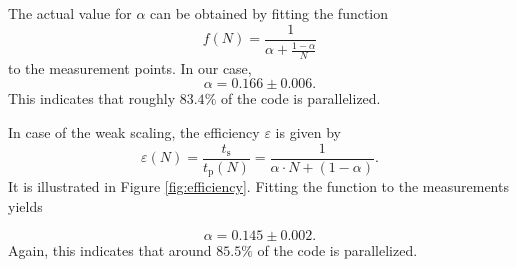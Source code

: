 \documentclass[12pt, a4paper, titlepage]{article}
\begin{document}
{%

The actual value for $\alpha$ can be obtained by fitting the function
\begin{equation}
f(N)=\frac{1}{\alpha + \frac{1-\alpha}{N}}
\end{equation}
to the measurement points. In our case,
\begin{equation} 
\alpha = 0.166 \pm 0.006.
\end{equation}
This indicates that roughly $83.4\%$ of the code is parallelized.

\newpage
In case of the weak scaling, the efficiency $\varepsilon$ is given by
\begin{equation*}
	\varepsilon (N) = \frac{t_\text{s}}{t_\text{p}(N)} = 	\frac{1}{\alpha\cdot N + (1-\alpha)}.
\end{equation*} 
It is illustrated in Figure \ref{fig:efficiency}. Fitting the function to the measurements yields


%


\begin{equation}
\alpha = 0.145 \pm 0.002.
\end{equation}
Again, this indicates that around $85.5\%$ of the code is parallelized.



}
\end{document}
